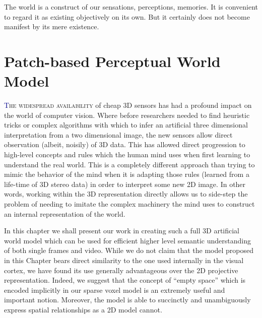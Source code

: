 \begin{savequote}[75mm]
The world is a construct of our sensations, perceptions, memories. It is convenient to regard it as existing objectively on its own. But it certainly does not become manifest by its mere existence.
\end{savequote}

\chapter{Patch-based Perceptual World Model}
\label{Chap:WorldModel}
\lettrine[lines=3, loversize=0.3]{\textcolor{DarkBlue}T}{he widespread availability} of cheap 3D sensors has had a profound impact on the world of computer vision. Where before researchers needed to find heuristic tricks or complex algorithms with which to infer an artificial three dimensional interpretation from a two dimensional image, the new sensors allow direct observation (albeit, noisily) of 3D data. This has allowed direct progression to high-level concepts and rules which the human mind uses when first learning to understand the real world. This is a completely different approach than trying to mimic the behavior of the mind when it is adapting those rules (learned from a life-time of 3D stereo data) in order to interpret some new 2D image. In other words, working within the 3D representation directly allows us to side-step the problem of needing to imitate the complex machinery\cite{pinker1978representation} the mind uses to construct an internal representation of the world. 

In this chapter we shall present our work in creating such a full 3D artificial world model which can be used for efficient higher level semantic understanding of both single frames and video. While we do not claim that the model proposed in this Chapter bears direct similarity to the one used internally in the visual cortex, we have found its use generally advantageous over the 2D projective representation. Indeed, we suggest that the concept of ``empty space'' which is encoded implicitly in our sparse voxel model is an extremely useful and important notion. Moreover, the model is able to succinctly and unambiguously express spatial relationships as a 2D model cannot.

